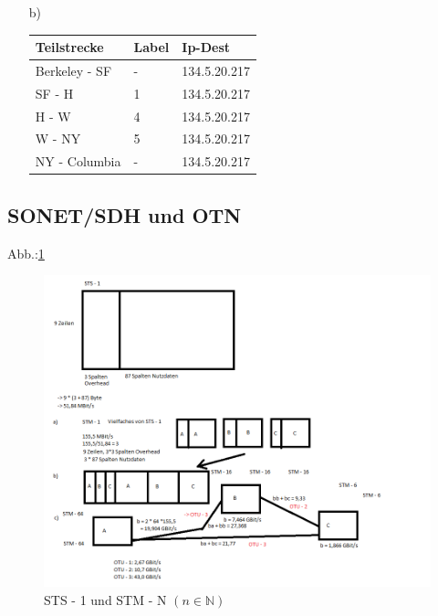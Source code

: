 \begin{itemize}
	\item[b)] 
	\begin{tabularx}{\textwidth}{|X|X|X|}
	\hline
	Teilstrecke	&Label	&Ip-Dest \\
	\hline
	Berkeley - SF	&-	&134.5.20.217 \\
	\hline
	SF - H		&1	&134.5.20.217 \\
	\hline
	H - W		&4	&134.5.20.217\\
	\hline
	W - NY		&5	&134.5.20.217 \\
	\hline
	NY - Columbia	&-	&134.5.20.217 \\
	\hline
\end{tabularx}
\end{itemize}
\subsection{SONET/SDH und OTN}
Abb.:\ref{img:SONET}
\begin{figure}
		\centering
		\includegraphics[width = 16cm]{./Rechnernetze/Images/4_5abc.png}
		\caption{STS - 1 und STM - N \((n \in \mathbb N)\)}
		\label{img:SONET}
\end{figure}

